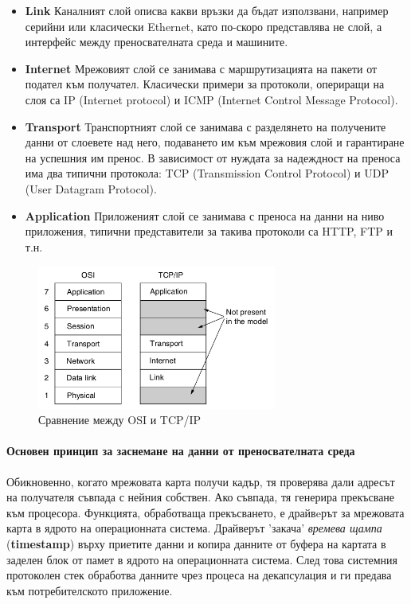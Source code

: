 \documentclass[12pt,a4paper,oneside]{book}
\begin{document}
\begin{itemize}
  \item \textbf{Link} Каналният слой описва какви връзки да бъдат използвани,
    например серийни или класически Ethernet, като по-скоро представлява не
    слой, а интерфейс между преносвателната среда и машините.
  \item \textbf{Internet} Мрежовият слой се занимава с маршрутизацията на
    пакети от подател към получател. Класически примери за протоколи, опериращи
    на слоя са IP (Internet protocol) и ICMP (Internet Control Message Protocol).
  \item \textbf{Transport} Транспортният слой се занимава с разделянето на
    получените данни от слоевете над него, подаването им към
    мрежовия слой и гарантиране на успешния им пренос. В зависимост от нуждата
    за надеждност на преноса има два типични протокола: TCP (Transmission
    Control Protocol) и UDP (User Datagram Protocol).
  \item \textbf{Application} Приложеният слой се занимава с преноса на данни на
    ниво приложения, типични представители за такива протоколи са HTTP, FTP и
    т.н.
\end{itemize}

\begin{figure}[h!]
  \centering
  \includegraphics[width=0.7\textwidth]{figures/osi_vs_tcp.png}
  \caption{Сравнение между OSI и TCP/IP}
  \label{osi_vs_tcp_Fig}
\end{figure}

\paragraph{Основен принцип за заснемане на данни от преносвателната среда}

Обикновенно, когато мрежовата карта получи кадър, тя проверява дали адресът на
получателя съвпада с нейния собствен. Ако съвпада, тя генерира прекъсване към
процесора. Функцията, обработваща прекъсването, е драйвeрът за мрежовата
карта в ядрото на операционната система. Драйверът 'закача' \textit{времева
щампа}
(\textbf{timestamp}) върху приетите данни и копира данните от буфера на картата
в заделен блок от памет в ядрото на операционната система. След това системния
протоколен стек обработва данните чрез процеса на декапсулация и ги предава към
потребителското приложение.
\end{document}
